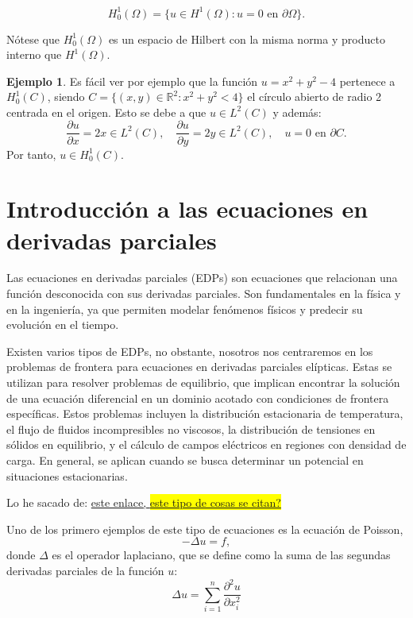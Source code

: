 \documentclass[a4paper,11pt,spanish, twoside, leqno]{tfg-uam}
\theoremstyle{definition}
\newtheorem{exmp}[teor]{Ejemplo}
\begin{document}
\begin{equation}
    H_0^1(\Omega)=\{u\in H^1(\Omega): u=0 \text{ en } \partial\Omega\}.
\end{equation}

Nótese que $H_0^1(\Omega)$ es un espacio de Hilbert con la misma norma y producto interno que $H^1(\Omega)$.



\begin{exmp}
    Es fácil ver por ejemplo que la función $u = x^2 + y^2 - 4$ pertenece a $H^1_0(C)$, siendo $C = \{(x,y)\in \mathbb{R}^2: x^2 + y^2 < 4\}$ el círculo abierto de radio 2 centrada en el origen. Esto se debe a que $u\in L^2(C)$ y además:
    \begin{equation*}
        \frac{\partial u}{\partial x} = 2x\in L^2(C), \quad \frac{\partial u}{\partial y} = 2y \in L^2(C), \quad u=0\text{ en  } \partial C.
    \end{equation*}
    Por tanto, $u\in H_0^1(C)$.
\end{exmp}


\section{Introducción a las ecuaciones en derivadas parciales}

Las ecuaciones en derivadas parciales (EDPs) son ecuaciones que relacionan una función desconocida con sus derivadas parciales. Son fundamentales en la física y en la ingeniería, ya que permiten modelar fenómenos físicos y predecir su evolución en el tiempo. 

Existen varios tipos de EDPs, no obstante, nosotros nos centraremos en los problemas de frontera para ecuaciones en derivadas parciales elípticas. Estas se utilizan para resolver problemas de equilibrio, que implican encontrar la solución de una ecuación diferencial en un dominio acotado con condiciones de frontera específicas. Estos problemas incluyen la distribución estacionaria de temperatura, el flujo de fluidos incompresibles no viscosos, la distribución de tensiones en sólidos en equilibrio, y el cálculo de campos eléctricos en regiones con densidad de carga. En general, se aplican cuando se busca determinar un potencial en situaciones estacionarias. 

Lo he sacado de: \href{https://www.ugr.es/~prodelas/ftp/ETSICCP/Resoluci%F3nNum%E9ricaEDPs.pdf}{este enlace, \colorbox{yellow}{este tipo de cosas se citan?}}


Uno de los primero ejemplos de este tipo de ecuaciones es la ecuación de Poisson,
\begin{equation*}
    -\Delta  u = f,
\end{equation*}
donde $\Delta$ es el operador laplaciano, que se define como la suma de las segundas derivadas parciales de la función $u$:
\begin{equation*}
    \Delta u = \sum_{i=1}^{n}\frac{\partial^2 u}{\partial x_i^2}
\end{equation*}
\end{document}
